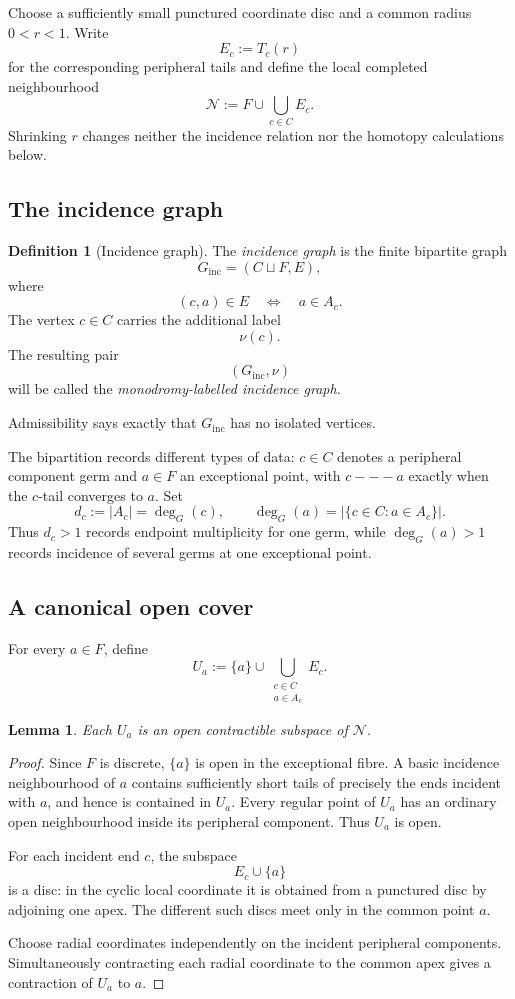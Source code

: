 \documentclass[11pt]{article}
\theoremstyle{plain}
\newtheorem{lemma}[theorem]{Lemma}
\theoremstyle{definition}
\newtheorem{definition}[theorem]{Definition}
\begin{document}
Choose a sufficiently small punctured coordinate disc and a common
radius $0<r<1$.  Write
\[
E_c:=T_c(r)
\]
for the corresponding peripheral tails and define the local completed
neighbourhood
\[
\mathcal N
:=
F\cup\bigcup_{c\in C}E_c.
\]
Shrinking $r$ changes neither the incidence relation nor the homotopy
calculations below.

\subsection{The incidence graph}
\label{subsec:incidence-graph}

\begin{definition}[Incidence graph]
\label{def:incidence-graph}
The \emph{incidence graph} is the finite bipartite graph
\[
G_{\mathrm{inc}}
=
(C\sqcup F,E),
\]
where
\[
(c,a)\in E
\quad\Longleftrightarrow\quad
a\in A_c.
\]
The vertex $c\in C$ carries the additional label
\[
\nu(c).
\]
The resulting pair
\[
(G_{\mathrm{inc}},\nu)
\]
will be called the \emph{monodromy-labelled incidence graph}.
\end{definition}

Admissibility says exactly that $G_{\mathrm{inc}}$ has no isolated
vertices.

The bipartition records different types of data: $c\in C$ denotes a
peripheral component germ and $a\in F$ an exceptional point, with
$c---a$ exactly when the $c$-tail converges to $a$.  Set
\[
d_c:=|A_c|=\deg_G(c),
\qquad
\deg_G(a)=|\{c\in C:a\in A_c\}|.
\]
Thus $d_c>1$ records endpoint multiplicity for one germ, while
$\deg_G(a)>1$ records incidence of several germs at one exceptional point.

\subsection{A canonical open cover}
\label{subsec:incidence-open-cover}

For every $a\in F$, define
\[
U_a
:=
\{a\}
\cup
\bigcup_{\substack{c\in C\\a\in A_c}}E_c.
\]

\begin{lemma}
\label{lem:Ua-open-contractible}
Each $U_a$ is an open contractible subspace of $\mathcal N$.
\end{lemma}

\begin{proof}
Since $F$ is discrete, $\{a\}$ is open in the exceptional fibre.
A basic incidence neighbourhood of $a$ contains sufficiently short
tails of precisely the ends incident with $a$, and hence is contained in
$U_a$.  Every regular point of $U_a$ has an ordinary open neighbourhood
inside its peripheral component.  Thus $U_a$ is open.

For each incident end $c$, the subspace
\[
E_c\cup\{a\}
\]
is a disc: in the cyclic local coordinate it is obtained from a punctured
disc by adjoining one apex.  The different such discs meet only in the
common point $a$.

Choose radial coordinates independently on the incident peripheral
components.  Simultaneously contracting each radial coordinate to the
common apex gives a contraction of $U_a$ to $a$.
\end{proof}
\end{document}
